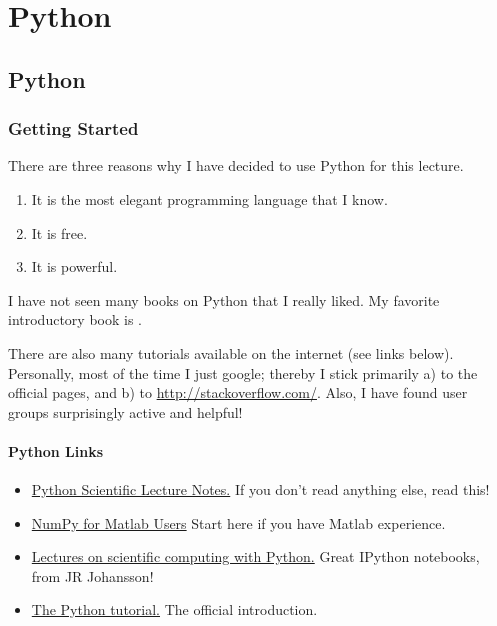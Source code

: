 \part{Python}

\chapter{Python}

\section{Getting Started}

There are three reasons why I have decided to use Python for this lecture.

\begin{enumerate}
  \item It is the most elegant programming language that I know.
  \item It is free.
  \item It is powerful.
\end{enumerate}

I have not seen many books on Python that I really liked. My favorite introductory book is \cite{Harms2010}.

There are also many tutorials available on the internet (see links below). Personally, most of the time I just google; thereby I stick primarily a) to the official pages, and b) to \url{http://stackoverflow.com/}. Also, I have found user groups surprisingly active and helpful!

\subsection{Python Links}

\begin{itemize}
  \item  \href{http://scipy-lectures.github.com}{Python Scientific Lecture Notes.} If you don't read anything else, read this!
  \item \href{http://www.scipy.org/NumPy\_for\_Matlab\_Users}{NumPy for Matlab Users} Start here if you have Matlab experience.
  \item \href{https://github.com/jrjohansson/scientific-python-lectures}{Lectures on scientific computing with Python.} Great IPython notebooks, from JR Johansson!
  \item \href{http://docs.python.org/2/tutorial}{The Python tutorial.} The official introduction.
\end{itemize}

